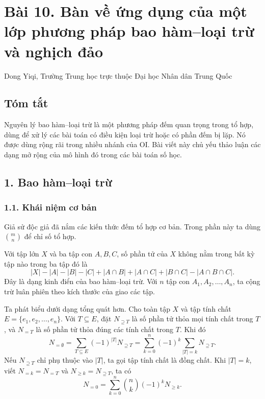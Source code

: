 \documentclass[11pt]{article}
\begin{document}
\section*{Bài 10. Bàn về ứng dụng của một lớp phương pháp bao hàm--loại trừ và nghịch đảo}

\begin{center}
Dong Yiqi, Trường Trung học trực thuộc Đại học Nhân dân Trung Quốc
\end{center}

\subsection*{Tóm tắt}

Nguyên lý bao hàm--loại trừ là một phương pháp đếm quan trọng trong tổ hợp,
dùng để xử lý các bài toán có điều kiện loại trừ hoặc có phần đếm bị lặp. Nó
được dùng rộng rãi trong nhiều nhánh của OI. Bài viết này chủ yếu thảo luận
các dạng mở rộng của mô hình đó trong các bài toán số học.

\subsection*{1. Bao hàm--loại trừ}

\subsubsection*{1.1. Khái niệm cơ bản}

Giả sử độc giả đã nắm các kiến thức đếm tổ hợp cơ bản. Trong phần này ta dùng
\(\binom mn\) để chỉ số tổ hợp.

Với tập lớn \(X\) và ba tập con \(A,B,C\), số phần tử của \(X\) không nằm trong
bất kỳ tập nào trong ba tập đó là
\[
|X|-|A|-|B|-|C|+|A\cap B|+|A\cap C|+|B\cap C|-|A\cap B\cap C|.
\]
Đây là dạng kinh điển của bao hàm--loại trừ. Với \(n\) tập con
\(A_1,A_2,\ldots,A_n\), ta cộng trừ luân phiên theo kích thước của giao các tập.

Ta phát biểu dưới dạng tổng quát hơn. Cho toàn tập \(X\) và tập tính chất
\(E=\{e_1,e_2,\ldots,e_n\}\). Với \(T\subseteq E\), đặt \(N_{\supseteq T}\) là
số phần tử thỏa mọi tính chất trong \(T\), và \(N_{=T}\) là số phần tử thỏa
đúng các tính chất trong \(T\). Khi đó
\[
N_{=\emptyset}=\sum_{T\subseteq E}(-1)^{|T|}N_{\supseteq T}
=\sum_{k=0}^n(-1)^k\sum_{|T|=k}N_{\supseteq T}.
\]
Nếu \(N_{\supseteq T}\) chỉ phụ thuộc vào \(|T|\), ta gọi tập tính chất là đồng
chất. Khi \(|T|=k\), viết \(N_{=k}=N_{=T}\) và \(N_{\ge k}=N_{\supseteq T}\),
ta có
\[
N_{=0}=\sum_{k=0}^n \binom nk(-1)^k N_{\ge k}.
\]
\end{document}
